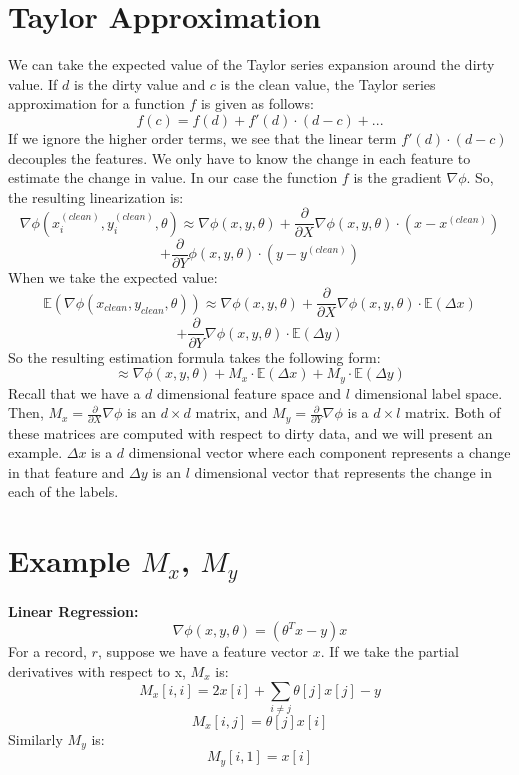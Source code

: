 \section{Taylor Approximation}\label{taylor-deriv}
We can take the expected value of the Taylor series expansion around the dirty value.
If $d$ is the dirty value and $c$ is the clean value, the Taylor series approximation for a function $f$ is given as follows:
\[
f(c) = f(d) + f'(d)\cdot(d-c) + ...
\]
If we ignore the higher order terms, we see that the linear term $f'(d)\cdot(d-c)$ decouples the features.
We only have to know the change in each feature to estimate the change in value.
In our case the function $f$ is the gradient $\nabla\phi$.
So, the resulting linearization is:
\[
\nabla\phi(x^{(clean)}_i,y^{(clean)}_i,\theta) \approx \nabla\phi(x,y,\theta) + \frac{\partial}{\partial X}\nabla\phi(x,y,\theta)\cdot (x - x^{(clean)}) \]
\[+ \frac{\partial}{\partial Y}\phi(x,y,\theta)\cdot (y - y^{(clean)})
\]
When we take the expected value:
\[
\mathbb{E}(\nabla\phi(x_{clean},y_{clean},\theta)) \approx \nabla\phi(x,y,\theta) + \frac{\partial}{\partial X}\nabla\phi(x,y,\theta)\cdot \mathbb{E}(\Delta x) \]
\[+ \frac{\partial}{\partial Y}\nabla\phi(x,y,\theta)\cdot \mathbb{E}(\Delta y)
\]
So the resulting estimation formula takes the following form:
\[
\approx \nabla\phi(x,y,\theta) + M_x \cdot \mathbb{E}(\Delta x) + M_y \cdot \mathbb{E}(\Delta y)
\]
Recall that we have a $d$ dimensional feature space and $l$ dimensional label space.
Then, $M_x = \frac{\partial}{\partial X}\nabla\phi$ is an $d \times d$ matrix, and $M_y = \frac{\partial}{\partial Y}\nabla\phi$ is a $d \times l$ matrix.
Both of these matrices are computed with respect to dirty data, and we will present an example.
$\Delta x$ is a $d$ dimensional vector where each component represents a change in that feature and $\Delta y$ is an $l$ dimensional vector that represents the change in each of the labels.

\section{Example $M_x$, $M_y$}\label{example-deriv}
\noindent\textbf{Linear Regression: }
\[
\nabla\phi(x,y,\theta) = (\theta^Tx - y)x
\]
For a record, $r$, suppose we have a feature vector $x$.
If we take the partial derivatives with respect to x, $M_x$ is:
\[
M_x[i,i] = 2x[i] + \sum_{i \ne j} \theta[j]x[j] - y 
\]
\[
M_x[i,j] = \theta[j]x[i]
\]
Similarly $M_y$ is:
\[
M_y[i,1] = x[i] 
\]

\vspace{0.5em}

